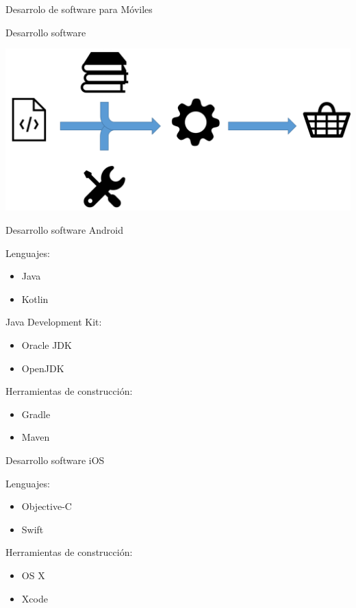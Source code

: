 \begin{frame}
    \centering
    \Huge{Desarrolo de software para Móviles}
\end{frame}

\begin{frame}{Desarrollo software}

\includegraphics[width=\textwidth]{images/developer-steps.png}

\end{frame}

\begin{frame}{Desarrollo software Android}

Lenguajes:

\begin{itemize}
    \item Java
    \item Kotlin
\end{itemize}

Java Development Kit:

\begin{itemize}
    \item Oracle JDK
    \item OpenJDK
\end{itemize}

Herramientas de construcción:

\begin{itemize}
    \item Gradle
    \item Maven
\end{itemize}

\end{frame}

\begin{frame}{Desarrollo software iOS}

Lenguajes:

\begin{itemize}
    \item Objective-C
    \item Swift
\end{itemize}

Herramientas de construcción:

\begin{itemize}
    \item OS X
    \item Xcode
\end{itemize}

\end{frame}

